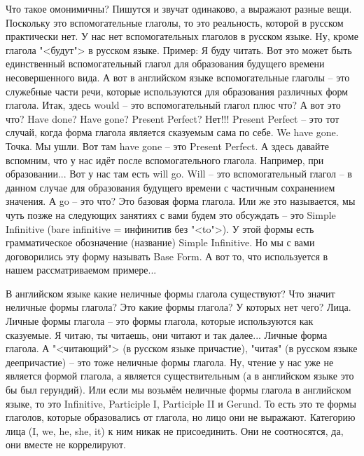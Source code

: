 \documentclass[main.tex]{subfiles}
\begin{document}
Что такое омонимичны?
Пишутся и звучат одинаково, а выражают разные вещи.
Поскольку это вспомогательные глаголы, то это реальность, которой в русском практически нет.
У нас нет вспомогательных глаголов в русском языке.
Ну, кроме глагола "<будут"> в русском языке.
Пример: Я буду читать.
Вот это может быть единственный вспомогательный глагол для образования будущего времени несовершенного вида.
А вот в английском языке вспомогательные глаголы -- это служебные части речи, которые используются для образования различных форм глагола.
Итак, здесь would -- это вспомогательный глагол плюс что?
А вот это что?
Have done?
Have gone?
Present Perfect?
Нет!!!
Present Perfect -- это тот случай, когда форма глагола является сказуемым сама по себе.
We have gone.
Точка.
Мы ушли.
Вот там have gone -- это Present Perfect.
А здесь давайте вспомним, что у нас идёт после вспомогательного глагола.
Например, при образовании...
Вот у нас там есть will go.
Will -- это вспомогательный глагол -- в данном случае для образования будущего времени с частичным сохранением значения.
А go -- это что?
Это базовая форма глагола.
Или же это называется, мы чуть позже на следующих занятиях с вами будем это обсуждать -- это Simple Infinitive (bare infinitive = инфинитив без "<to">).
У этой формы есть грамматическое обозначение (название) Simple Infinitive.
Но мы с вами договорились эту форму называть Base Form.
А вот то, что используется в нашем рассматриваемом примере...

В английском языке какие неличные формы глагола существуют?
Что значит неличные формы глагола?
Это какие формы глагола?
У которых нет чего?
Лица.
Личные формы глагола -- это формы глагола, которые используются как сказуемые.
Я читаю, ты читаешь, они читают и так далее...
Личные форма глагола.
А "<читающий"> (в русском языке причастие), "читая" (в русском языке деепричастие) -- это тоже неличные формы глагола.
Ну, чтение у нас уже не является формой глагола, а является существительным (а в английском языке это бы был герундий).
Или если мы возьмём неличные формы глагола в английском языке, то это Infinitive, Participle I, Participle II и Gerund.
То есть это те формы глаголов, которые образовались от глагола, но лицо они не выражают.
Категорию лица (I, we, he, she, it) к ним никак не присоединить.
Они не соотносятся, да, они вместе не коррелируют.
\end{document}
